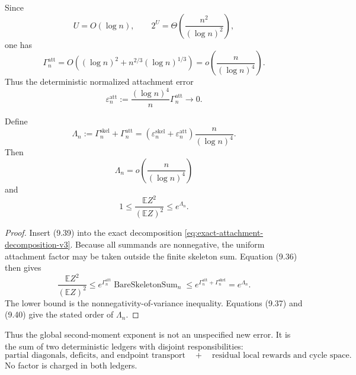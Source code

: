 Since
\[
  U=O(\log n),
  \qquad
  2^U=\Theta\!\left(\frac{n^2}{(\log n)^2}\right),
\]
one has
\[
  \Gamma_n^{\mathrm{att}}
  =O\!\left(
    (\log n)^2+n^{2/3}(\log n)^{1/3}
  \right)
  =o\!\left(\frac{n}{(\log n)^4}\right).
\]
Thus the deterministic normalized attachment error
\begin{equation*}
  \varepsilon_n^{\mathrm{att}}
  :=
  \frac{(\log n)^4}{n}\Gamma_n^{\mathrm{att}}
  \longrightarrow0.
  \tag{9.40}
\end{equation*}

\begin{proposition}
\label{prop:explicit-normalized-second-moment-ledger-v3}
Define
\begin{equation*}
  \Lambda_n
  :=
  \Gamma_n^{\mathrm{skel}}+\Gamma_n^{\mathrm{att}}
  =
  \left(
    \varepsilon_n^{\mathrm{skel}}
    +\varepsilon_n^{\mathrm{att}}
  \right)
  \frac{n}{(\log n)^4}.
  \tag{9.41}
\end{equation*}
Then
\[
  \Lambda_n=o\!\left(\frac{n}{(\log n)^4}\right)
\]
and
\begin{equation*}
  1
  \le
  \frac{\mathbb E Z^2}{(\mathbb E Z)^2}
  \le e^{\Lambda_n}.
  \tag{9.42}
\end{equation*}
\end{proposition}

\begin{proof}
Insert (9.39) into the exact decomposition
\eqref{eq:exact-attachment-decomposition-v3}. Because all summands are
nonnegative, the uniform attachment factor may be taken outside the finite
skeleton sum. Equation (9.36) then gives
\[
  \frac{\mathbb E Z^2}{(\mathbb E Z)^2}
  \le
  e^{\Gamma_n^{\mathrm{att}}}
  \operatorname{BareSkeletonSum}_n
  \le
  e^{\Gamma_n^{\mathrm{att}}+\Gamma_n^{\mathrm{skel}}}
  =e^{\Lambda_n}.
\]
The lower bound is the nonnegativity-of-variance inequality. Equations (9.37)
and (9.40) give the stated order of $\Lambda_n$.
\end{proof}

Thus the global second-moment exponent is not an unspecified new error. It is
the sum of two deterministic ledgers with disjoint responsibilities:
\[
  \text{partial diagonals, deficits, and endpoint transport}
  \quad+\quad
  \text{residual local rewards and cycle space}.
\]
No factor is charged in both ledgers.